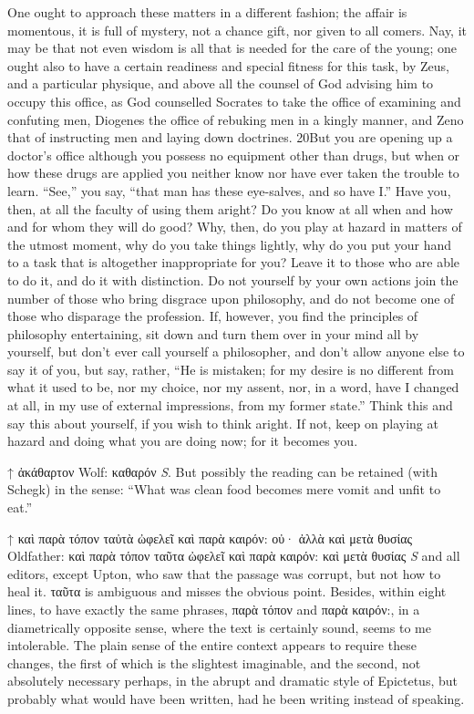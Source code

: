 One ought to approach these matters in a different fashion; the affair is momentous, it is full of mystery, not a chance gift, nor given to all comers. Nay, it may be that not even wisdom is all that is needed for the care of the young; one ought also to have a certain readiness and special fitness for this task, by Zeus, and a particular physique, and above all the counsel of God advising him to occupy this office, as God counselled Socrates to take the office of examining and confuting men, Diogenes the office of rebuking men in a kingly manner, and Zeno that of instructing men and laying down doctrines. 20But you are opening up a doctor's office although you possess no equipment other than drugs, but when or how these drugs are applied you neither know nor have ever taken the trouble to learn. ``See,'' you say, ``that man has these eye-salves, and so have I.'' Have you, then, at all the faculty of using them aright? Do you know at all when and how and for whom they will do good? Why, then, do you play at hazard in matters of the utmost moment, why do you take things lightly, why do you put your hand to a task that is altogether inappropriate for you? Leave it to those who are able to do it, and do it with distinction. Do not yourself by your own actions join the number of those who bring disgrace upon philosophy, and do not become one of those who disparage the profession. If, however, you find the principles of philosophy entertaining, sit down and turn them over in your mind all by yourself, but don't ever call yourself a philosopher, and don't allow anyone else to say it of you, but say, rather, ``He is mistaken; for my desire is no different from what it used to be, nor my choice, nor my assent, nor, in a word, have I changed at all, in my use of external impressions, from my former state.'' Think this and say this about yourself, if you wish to think aright. If not, keep on playing at hazard and doing what you are doing now; for it becomes you.



↑ ἀκάθαρτον Wolf: καθαρόν \emph{S}. But possibly the reading can be retained (with Schegk) in the sense: ``What was clean food becomes mere vomit and unfit to eat.''

↑ καὶ παρὰ τόπον ταὐτὰ ὠφελεῖ καὶ παρὰ καιρόν: οὐ· ἀλλὰ καὶ μετὰ θυσίας Oldfather: καὶ παρὰ τόπον ταῦτα ὠφελεῖ καὶ παρὰ καιρόν: καὶ μετὰ θυσίας \emph{S} and all editors, except Upton, who saw that the passage was corrupt, but not how to heal it. ταῦτα is ambiguous and misses the obvious point. Besides, within eight lines, to have exactly the same phrases, παρὰ τόπον and παρὰ καιρόν:, in a diametrically opposite sense, where the text is certainly sound, seems to me intolerable. The plain sense of the entire context appears to require these changes, the first of which is the slightest imaginable, and the second, not absolutely necessary perhaps, in the abrupt and dramatic style of Epictetus, but probably what would have been written, had he been writing instead of speaking.

